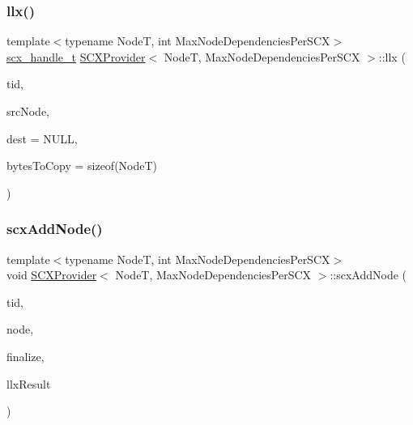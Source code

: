\subsubsection{\texorpdfstring{llx()}{llx()}}
{\footnotesize\ttfamily template$<$typename NodeT, int Max\+Node\+Dependencies\+Per\+S\+CX$>$ \\
\hyperlink{scx__provider_8h_a368fa55a4b553010913289d3cbe6ce22}{scx\+\_\+handle\+\_\+t} \hyperlink{classSCXProvider}{S\+C\+X\+Provider}$<$ NodeT, Max\+Node\+Dependencies\+Per\+S\+CX $>$\+::llx (\begin{DoxyParamCaption}\item[{const int}]{tid,  }\item[{NodeT const $\ast$const}]{src\+Node,  }\item[{NodeT $\ast$const}]{dest = {\ttfamily NULL},  }\item[{const int}]{bytes\+To\+Copy = {\ttfamily sizeof(NodeT)} }\end{DoxyParamCaption})\hspace{0.3cm}{\ttfamily [inline]}}

\mbox{\label{classSCXProvider_ab7285a46263d7b6885e21e73b4e6ec6b}} 
\subsubsection{\texorpdfstring{scx\+Add\+Node()}{scxAddNode()}}
{\footnotesize\ttfamily template$<$typename NodeT, int Max\+Node\+Dependencies\+Per\+S\+CX$>$ \\
void \hyperlink{classSCXProvider}{S\+C\+X\+Provider}$<$ NodeT, Max\+Node\+Dependencies\+Per\+S\+CX $>$\+::scx\+Add\+Node (\begin{DoxyParamCaption}\item[{const int}]{tid,  }\item[{NodeT $\ast$const}]{node,  }\item[{bool}]{finalize,  }\item[{\hyperlink{scx__provider_8h_a368fa55a4b553010913289d3cbe6ce22}{scx\+\_\+handle\+\_\+t} const}]{llx\+Result }\end{DoxyParamCaption})\hspace{0.3cm}{\ttfamily [inline]}}

\mbox{\label{classSCXProvider_a33cbfd79cc911b36aba19311a30893dd}} 
